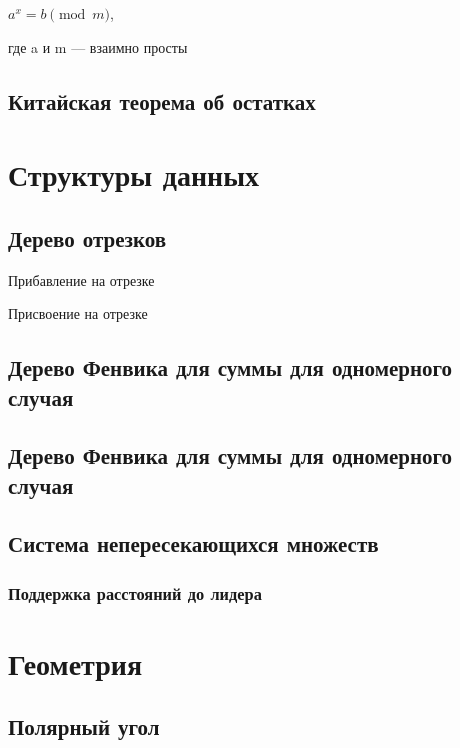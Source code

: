 \documentclass[a4paper]{article}
\begin{document}
\begin{multicols*}{2}
		$a^x = b \pmod m$, 
		
		где a и m — взаимно просты 
		
		\subsection{Китайская теорема об остатках}
		
		
		\section{Структуры данных}
		\subsection{Дерево отрезков}
		
		 Прибавление на отрезке
		 
		 Присвоение на отрезке
		 
		 \subsection{Дерево Фенвика для суммы для одномерного случая}
		 		 
		 \subsection{Дерево Фенвика для суммы для одномерного случая}
		 
		 \subsection{Система непересекающихся множеств}
		 
		 \subsubsection{Поддержка расстояний до лидера}
		 
		 
		 \section{Геометрия}
		 \subsection{Полярный угол}
		 

\end{multicols*}
\end{document}

